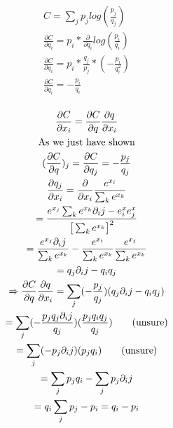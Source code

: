 \documentclass[11pt,a4paper]{article}
\begin{document}
\begin{gather*}
C = \sum_j p_j log(\frac{p_j}{q_j}) \\
\frac{\partial C}{\partial q_i} = p_i * \frac{\partial}{\partial q_i} log(\frac{p_i}{q_i}) \\
\frac{\partial C}{\partial q_i} = p_i * \frac{q_j}{p_j} * (-\frac{p_i}{q_i^2}) \\
\frac{\partial C}{\partial q_i} = -\frac{p_i}{q_i} \\
\end{gather*}

\begin{gather*}
\frac{\partial C}{\partial x_i} = \frac{\partial C}{\partial q} \frac{\partial q}{\partial x_i} \\
\text{As we just have shown}\\
(\frac{\partial C}{\partial q})_j = \frac{\partial C}{\partial q_j} = -\frac{p_j}{q_j} \\
\frac{\partial q_j}{\partial x_i} = \frac{\partial}{\partial x_i} \frac{e^{x_i}}{\sum_k e^{x_k}} \\
= \frac{e^{x_j} \sum_k e^{x_k} \partial _ij - e^x_i e^x_j}{\big[ \sum_k e^{x_k} \big]^2} \\
= \frac{e^{x_j} \partial _ij}{\sum_k e^{x_k}} - \frac{e^{x_i}}{\sum_k e^{x_k}} \frac{e^{x_j}}{\sum_k e^{x_k}} \\
= q_j \partial _ij - q_i q_j \\
\xRightarrow[]{}
\frac{\partial C}{\partial q} \frac{\partial q}{\partial x_i} = \sum_j (-\frac{p_j}{q_j})(q_j \partial _ij - q_iq_j) \\
= \sum_j (-\frac{p_j q_j \partial _ij}{q_j})(\frac{p_j q_iq_j}{q_j}) \tag{unsure} \\
= \sum_j (-p_j \partial _ij)(p_j q_i) \tag{unsure}\\
= \sum_j p_jq_i - \sum_j p_j \partial _ij \\
= q_i \sum_j p_j - p_i
= q_i - p_i
\end{gather*}

\end{document}
